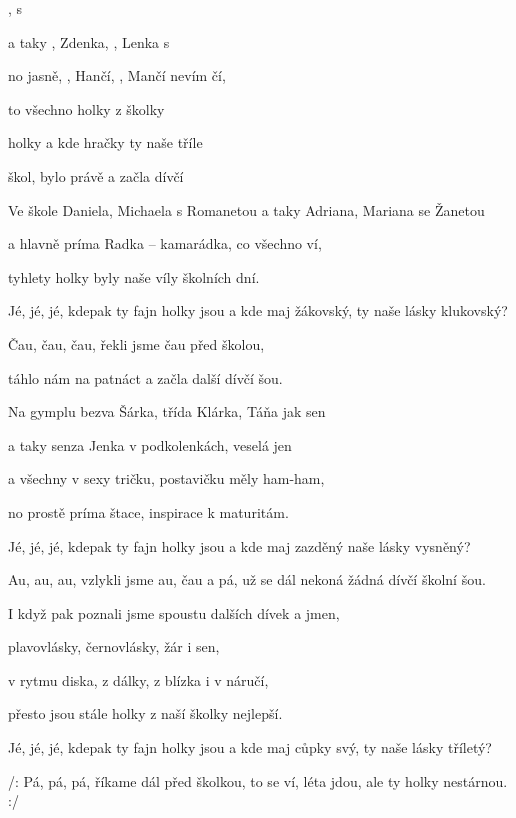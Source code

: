 

\zs
{},  s 

a taky , Zdenka, , Lenka s 

no jasně, , Hančí, , Mančí  nevím čí,

to všechno  holky z  školky 
\ks

\zr
{}  
  holky 
a kde  hračky 
ty naše  tříle

  
  škol,
bylo  právě 
a začla  dívčí 
\kr

\zs
Ve škole Daniela, Michaela s Romanetou
a taky Adriana, Mariana se Žanetou

a hlavně príma Radka -- kamarádka, co všechno ví,

tyhlety holky byly naše víly školních dní.
\ks

\zr
Jé, jé, jé,
kdepak ty fajn holky jsou
a kde maj žákovský,
ty naše lásky klukovský?

Čau, čau, čau,
řekli jsme čau před školou,

táhlo nám na patnáct
a začla další dívčí šou.
\kr

\zs
Na gymplu bezva Šárka, třída Klárka, Táňa jak sen

a taky senza Jenka v podkolenkách, veselá jen

a všechny v sexy tričku, postavičku měly ham-ham,

no prostě príma štace, inspirace k maturitám.
\ks

\zr
Jé, jé, jé,
kdepak ty fajn holky jsou
a kde maj zazděný
naše lásky vysněný?

Au, au, au,
vzlykli jsme au, čau a pá,
už se dál nekoná
žádná dívčí školní šou.
\kr

\zs
I když pak poznali jsme spoustu dalších dívek a jmen,

plavovlásky, černovlásky, žár i sen,

v rytmu diska, z dálky, z blízka i v náručí,

přesto jsou stále holky z naší školky nejlepší.
\ks

\zr
Jé, jé, jé,
kdepak ty fajn holky jsou
a kde maj cůpky svý,
ty naše lásky tříletý?

/: Pá, pá, pá,
říkame dál před školkou,
to se ví, léta jdou,
ale ty holky nestárnou. :/
\kr

\kp
